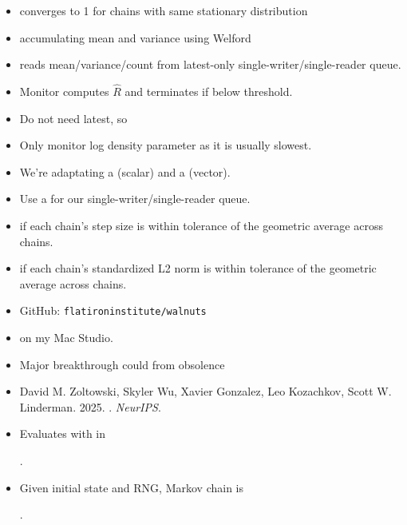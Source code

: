 \documentclass[10pt]{report}
\begin{document}
\begin{itemize}
  \item {} converges to 1 for chains with same
    stationary distribution
  \item {} accumulating mean and variance
    using Welford
  \item {} reads mean/variance/count from
    latest-only single-writer/single-reader queue.
  \item Monitor computes $\widehat{R}$ and terminates if below
    threshold.
  \item Do not need latest, so 
    \item Only monitor log density parameter as it is usually slowest.
\end{itemize}

\begin{itemize}
\item We're adaptating a  (scalar) and a 
  (vector).
\item Use a  for our single-writer/single-reader
  queue.
\item {} if each chain's step size is
  within tolerance of the geometric average across chains.
\item {} if each chain's standardized L2
  norm is within tolerance of the geometric average across chains.
  \vfill
\item GitHub: \texttt{flatironinstitute/walnuts}
\item {} on my Mac Studio.
\end{itemize}

\begin{itemize}
\item Major breakthrough could  from obsolence
\item David M. Zoltowski, Skyler Wu, Xavier Gonzalez, Leo
  Kozachkov, Scott W. Linderman. 2025.  . {\slshape NeurIPS}.
\vfill
\item 
  Evaluates  with  in
  \begin{center}
    .
    \end{center}
\item Given initial state and RNG, Markov chain is
  \begin{center}
    .
    \end{center}
\end{itemize}
\end{document}
